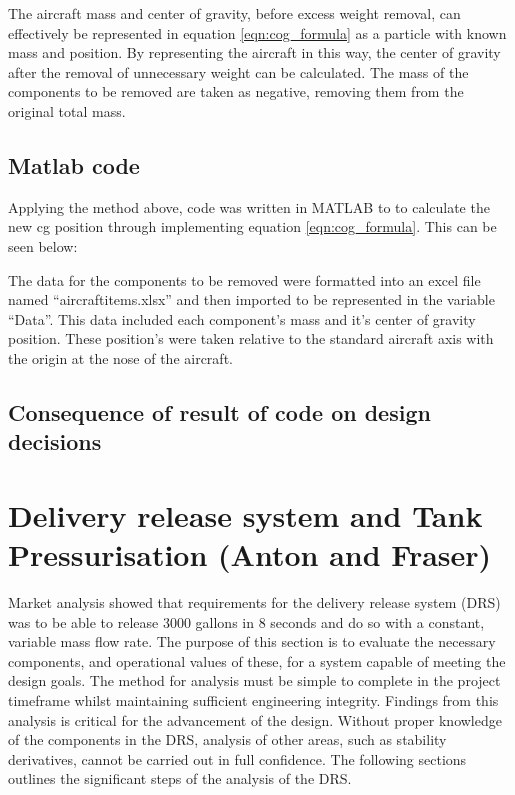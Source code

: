 The aircraft mass and center of gravity, before excess weight removal, can effectively be represented in equation \ref{eqn:cog_formula} as a particle with known mass and position.
By representing the aircraft in this way, the center of gravity after the removal of unnecessary weight can be calculated.
The mass of the components to be removed are taken as negative, removing them from the original total mass.

\subsection{Matlab code}
Applying the method above, code was written in MATLAB to to calculate the new cg position through implementing equation \ref{eqn:cog_formula}.
This can be seen below:



The data for the components to be removed were formatted into an excel file named “aircraftitems.xlsx” and then imported to be represented in the variable “Data”.
This data included each component's mass and it's center of gravity position.
These position's were taken relative to the standard aircraft axis with the origin at the nose of the aircraft.

\subsection{Consequence of result of code on design decisions}



\section{Delivery release system and  Tank Pressurisation (Anton and Fraser)}
Market analysis showed that requirements for the delivery release system (DRS) was to be able to release 3000 gallons in 8 seconds and do so with a constant, variable mass flow rate. 
The purpose of this section is to evaluate the necessary components, and operational values of these, for a system capable of meeting the design goals. The method for analysis must be simple to complete in the project timeframe whilst maintaining sufficient engineering integrity. Findings from this analysis is critical for the advancement of the design. Without proper knowledge of the components in the DRS, analysis of other areas, such as stability derivatives, cannot be carried out in full confidence. 
The following sections outlines the significant steps of the analysis of the DRS.

